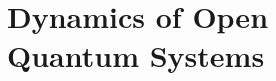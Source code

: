 \chapter[Dynamics of Open Quantum Systems]
  {Dynamics of Open\\ Quantum Systems}
  \label{apx:qu_dyn}